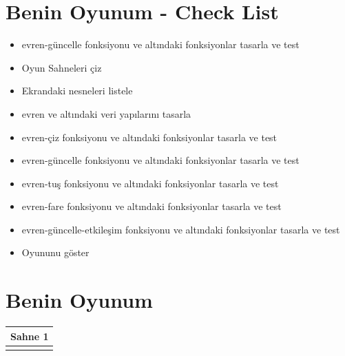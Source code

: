 \documentclass[12pt, a4paper]{article}
\begin{document}







\veriyapi{ }



\section*{Benin Oyunum - Check List}
\begin{itemize}
	\item evren-güncelle  fonksiyonu ve altındaki fonksiyonlar tasarla ve test
	\item Oyun Sahneleri çiz
	\item Ekrandaki nesneleri listele
	\item evren ve altındaki veri yapılarını tasarla
	\item evren-çiz fonksiyonu ve altındaki fonksiyonlar tasarla ve test
	\item evren-güncelle  fonksiyonu ve altındaki fonksiyonlar tasarla ve test
	\item evren-tuş  fonksiyonu ve altındaki fonksiyonlar tasarla ve test
	\item evren-fare  fonksiyonu ve altındaki fonksiyonlar tasarla ve test
	\item evren-güncelle-etkileşim  fonksiyonu ve altındaki fonksiyonlar tasarla ve test
	\item Oyununu göster

\end{itemize}
\newpage
{}
\section*{Benin Oyunum}
\noindent
{}
\noindent
\begin{tabular}{| p{16.5cm}  |  }
\hline			
Sahne 1\\
\hline
\\[50ex]
\hline  
\end{tabular}
\end{document}
